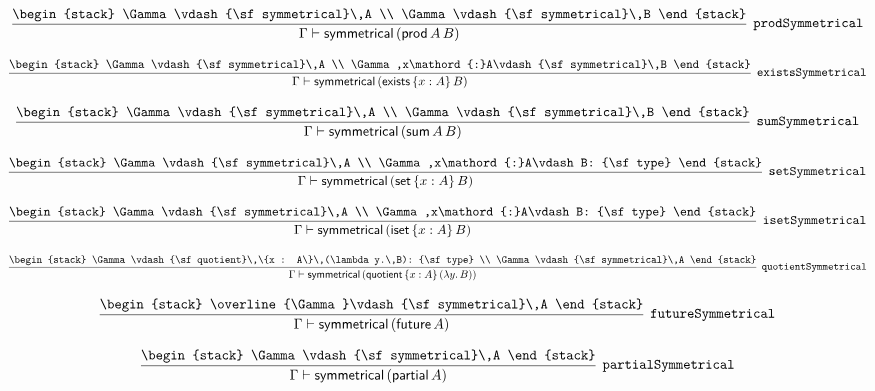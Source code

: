 \[
\infer[{\tt prodSymmetrical}]{\Gamma \vdash {\sf symmetrical}\,({\sf prod}\,A\,B)}{
\begin{stack}
\Gamma \vdash {\sf symmetrical}\,A
\\
\Gamma \vdash {\sf symmetrical}\,B
\end{stack}}
\]

\[
\infer[{\tt existsSymmetrical}]{\Gamma \vdash {\sf symmetrical}\,({\sf exists}\,\{x : A\}\,B)}{
\begin{stack}
\Gamma \vdash {\sf symmetrical}\,A
\\
\Gamma ,x\mathord{:}A\vdash {\sf symmetrical}\,B
\end{stack}}
\]

\[
\infer[{\tt sumSymmetrical}]{\Gamma \vdash {\sf symmetrical}\,({\sf sum}\,A\,B)}{
\begin{stack}
\Gamma \vdash {\sf symmetrical}\,A
\\
\Gamma \vdash {\sf symmetrical}\,B
\end{stack}}
\]

\[
\infer[{\tt setSymmetrical}]{\Gamma \vdash {\sf symmetrical}\,({\sf set}\,\{x : A\}\,B)}{
\begin{stack}
\Gamma \vdash {\sf symmetrical}\,A
\\
\Gamma ,x\mathord{:}A\vdash B: {\sf type}
\end{stack}}
\]

\[
\infer[{\tt isetSymmetrical}]{\Gamma \vdash {\sf symmetrical}\,({\sf iset}\,\{x : A\}\,B)}{
\begin{stack}
\Gamma \vdash {\sf symmetrical}\,A
\\
\Gamma ,x\mathord{:}A\vdash B: {\sf type}
\end{stack}}
\]

\[
\infer[{\tt quotientSymmetrical}]{\Gamma \vdash {\sf symmetrical}\,({\sf quotient}\,\{x : A\}\,(\lambda y.\,B))}{
\begin{stack}
\Gamma \vdash {\sf quotient}\,\{x : A\}\,(\lambda y.\,B): {\sf type}
\\
\Gamma \vdash {\sf symmetrical}\,A
\end{stack}}
\]

\[
\infer[{\tt futureSymmetrical}]{\Gamma \vdash {\sf symmetrical}\,({\sf future}\,A)}{
\begin{stack}
\overline{\Gamma}\vdash {\sf symmetrical}\,A
\end{stack}}
\]

\[
\infer[{\tt partialSymmetrical}]{\Gamma \vdash {\sf symmetrical}\,({\sf partial}\,A)}{
\begin{stack}
\Gamma \vdash {\sf symmetrical}\,A
\end{stack}}
\]

